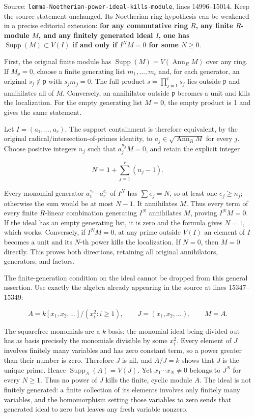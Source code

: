 Source: \texttt{lemma-Noetherian-power-ideal-kills-module}, lines 14996--15014. Keep the source statement unchanged. Its Noetherian-ring hypothesis can be weakened in a precise editorial extension: \textbf{for any commutative ring \(R\), any finite \(R\)-module \(M\), and any finitely generated ideal \(I\), one has \(\operatorname{Supp}(M)\subset V(I)\) if and only if \(I^NM=0\) for some \(N\geq0\)}.

First, the original finite module has \(\operatorname{Supp}(M)=V(\operatorname{Ann}_R M)\) over any ring. If \(M_{\mathfrak p}=0\), choose a finite generating list \(m_1,\ldots,m_t\) and, for each generator, an original \(s_j\notin\mathfrak p\) with \(s_jm_j=0\). The full product \(s=\prod_{j=1}^t s_j\) lies outside \(\mathfrak p\) and annihilates all of \(M\). Conversely, an annihilator outside \(\mathfrak p\) becomes a unit and kills the localization. For the empty generating list \(M=0\), the empty product is 1 and gives the same statement.

Let \(I=(a_1,\ldots,a_r)\). The support containment is therefore equivalent, by the original radical/intersection-of-primes identity, to \(a_j\in\sqrt{\operatorname{Ann}_R M}\) for every \(j\). Choose positive integers \(n_j\) such that \(a_j^{n_j}M=0\), and retain the explicit integer

\[
N=1+\sum_{j=1}^r(n_j-1).
\]

Every monomial generator \(a_1^{e_1}\cdots a_r^{e_r}\) of \(I^N\) has \(\sum e_j=N\), so at least one \(e_j\geq n_j\); otherwise the sum would be at most \(N-1\). It annihilates \(M\). Thus every term of every finite \(R\)-linear combination generating \(I^N\) annihilates \(M\), proving \(I^NM=0\). If the ideal has an empty generating list, it is zero and the formula gives \(N=1\), which works. Conversely, if \(I^NM=0\), at any prime outside \(V(I)\) an element of \(I\) becomes a unit and its \(N\)-th power kills the localization. If \(N=0\), then \(M=0\) directly. This proves both directions, retaining all original annihilators, generators, and factors.

The finite-generation condition on the ideal cannot be dropped from this general assertion. Use exactly the algebra already appearing in the source at lines 15347--15349:

\[
A=k[x_1,x_2,\ldots]/(x_i^2:i\geq1),\qquad
J=(x_1,x_2,\ldots),\qquad M=A.
\]

The squarefree monomials are a \(k\)-basis: the monomial ideal being divided out has as basis precisely the monomials divisible by some \(x_i^2\). Every element of \(J\) involves finitely many variables and has zero constant term, so a power greater than their number is zero. Therefore \(J\) is nil, and \(A/J=k\) shows that \(J\) is the unique prime. Hence \(\operatorname{Supp}_A(A)=V(J)\). Yet \(x_1\cdots x_N\ne0\) belongs to \(J^N\) for every \(N\geq1\). Thus no power of \(J\) kills the finite, cyclic module \(A\). The ideal is not finitely generated: a finite collection of its elements involves only finitely many variables, and the homomorphism setting those variables to zero sends that generated ideal to zero but leaves any fresh variable nonzero.

